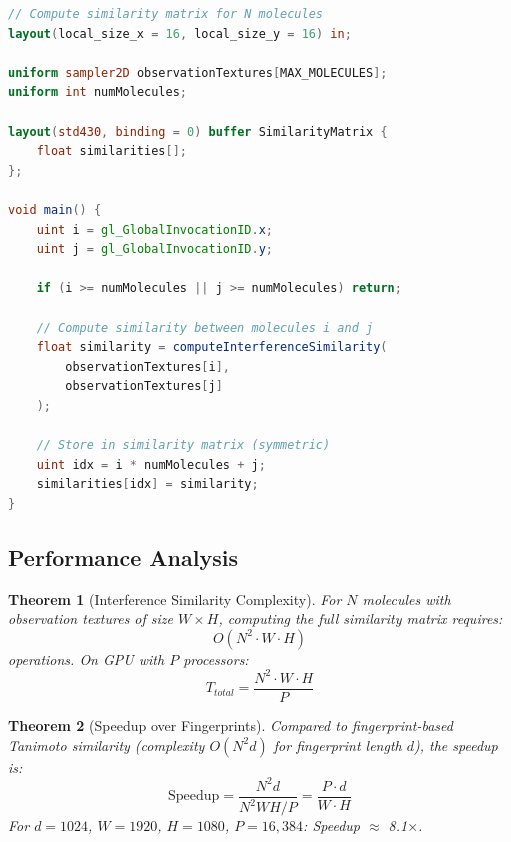 \documentclass[11pt,a4paper]{article}
\newtheorem{theorem}{Theorem}[section]
\theoremstyle{definition}
\theoremstyle{remark}
\begin{document}
\begin{lstlisting}[language=GLSL,caption={Batch Similarity Computation}]
// Compute similarity matrix for N molecules
layout(local_size_x = 16, local_size_y = 16) in;

uniform sampler2D observationTextures[MAX_MOLECULES];
uniform int numMolecules;

layout(std430, binding = 0) buffer SimilarityMatrix {
    float similarities[];
};

void main() {
    uint i = gl_GlobalInvocationID.x;
    uint j = gl_GlobalInvocationID.y;
    
    if (i >= numMolecules || j >= numMolecules) return;
    
    // Compute similarity between molecules i and j
    float similarity = computeInterferenceSimilarity(
        observationTextures[i],
        observationTextures[j]
    );
    
    // Store in similarity matrix (symmetric)
    uint idx = i * numMolecules + j;
    similarities[idx] = similarity;
}
\end{lstlisting}

\subsection{Performance Analysis}

\begin{theorem}[Interference Similarity Complexity]
\label{thm:interference_complexity}
For $N$ molecules with observation textures of size $W \times H$, computing the full similarity matrix requires:
\begin{equation}
O(N^2 \cdot W \cdot H)
\end{equation}
operations. On GPU with $P$ processors:
\begin{equation}
T_{total} = \frac{N^2 \cdot W \cdot H}{P}
\end{equation}
\end{theorem}

\begin{theorem}[Speedup over Fingerprints]
\label{thm:interference_speedup}
Compared to fingerprint-based Tanimoto similarity (complexity $O(N^2 d)$ for fingerprint length $d$), the speedup is:
\begin{equation}
\text{Speedup} = \frac{N^2 d}{N^2 WH / P} = \frac{P \cdot d}{W \cdot H}
\end{equation}
For $d=1024$, $W=1920$, $H=1080$, $P=16{,}384$: Speedup $\approx$ 8.1$\times$.
\end{theorem}
\end{document}
